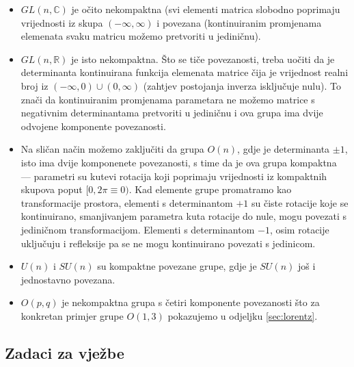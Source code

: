 \begin{itemize}
\item $GL(n, \mathbb{C})$ je očito nekompaktna (svi elementi matrica
slobodno poprimaju vrijednosti iz skupa $(-\infty, \infty)$ i povezana
(kontinuiranim promjenama elemenata svaku matricu možemo pretvoriti u
jediničnu).

\item $GL(n, \mathbb{R})$ je isto nekompaktna. Što se tiče povezanosti,
treba uočiti da je determinanta kontinuirana funkcija elemenata matrice
čija je vrijednost realni broj iz $(-\infty, 0) \cup (0, \infty)$
(zahtjev postojanja inverza isključuje nulu). To znači da kontinuiranim
promjenama parametara ne možemo matrice s negativnim determinantama
pretvoriti u jediničnu i ova grupa ima dvije odvojene komponente povezanosti.

\item Na sličan način možemo zaključiti da grupa $O(n)$, gdje je
determinanta $\pm 1$, isto ima dvije komponenete povezanosti, s time
da je ova grupa kompaktna --- parametri su kutevi rotacija koji poprimaju
vrijednosti iz kompaktnih skupova poput $[0, 2\pi\equiv0)$.
Kad elemente grupe promatramo kao transformacije prostora, elementi
s determinantom $+1$ su čiste rotacije koje se kontinuirano, smanjivanjem
parametra kuta rotacije do nule, mogu povezati s jediničnom transformacijom.
Elementi s determinantom $-1$, osim rotacije uključuju i refleksije pa se
ne mogu kontinuirano povezati s jedinicom.  \label{pag:detO3}

\item $U(n)$ i $SU(n)$ su kompaktne povezane grupe, gdje je $SU(n)$ još i
jednostavno povezana.

\item $O(p, q)$ je nekompaktna grupa s četiri komponente povezanosti
što za konkretan primjer grupe $O(1,3)$ pokazujemo u odjeljku \ref{sec:lorentz}.

\end{itemize}

\subsection*{Zadaci za vježbe}

